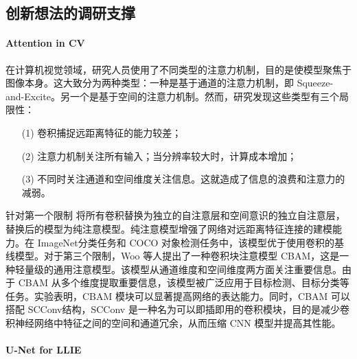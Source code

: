 \documentclass[a4paper, 10pt]{article}
\begin{document}
		\subsection{创新想法的调研支撑}
		
		\paragraph{Attention in CV}
		
		在计算机视觉领域，研究人员使用了不同类型的注意力机制，目的是使模型聚焦于图像本身。这大致分为两种类型：一种是基于通道的注意力机制，即 Squeeze-and-Excite。另一个是基于空间的注意力机制\cite{woo2018cbam}。然而，研究发现这些类型有三个局限性：
		
		\begin{itemize}
			\item[(1)] 
			卷积捕捉远距离特征的能力较差；
			
			\item[(2)]
			注意力机制关注所有输入；当分辨率较大时，计算成本增加；
			
			\item[(3)]
			不同时关注通道和空间维度关注信息。这就造成了信息的浪费和注意力的减弱。
		\end{itemize}	
		
		针对第一个限制 \cite{ramachandran2019stand} 将所有卷积替换为独立的自注意层和空间意识的独立自注意层，替换后的模型为纯注意模型。纯注意模型增强了网络对远距离特征连接的建模能力。在 ImageNet分类任务和 COCO 对象检测任务中，该模型优于使用卷积的基线模型。对于第三个限制，Woo 等人\cite{woo2018cbam}提出了一种卷积块注意模型 CBAM，这是一种轻量级的通用注意模型。该模型从通道维度和空间维度两方面关注重要信息。由于 CBAM 从多个维度提取重要信息，该模型被广泛应用于目标检测、目标分类等任务。实验表明，CBAM 模块可以显著提高网络的表达能力。同时，CBAM 可以搭配 SCConv\cite{li2023scconv}结构，SCConv 是一种名为可以即插即用的卷积模块，目的是减少卷积神经网络中特征之间的空间和通道冗余，从而压缩 CNN 模型并提高其性能。
		
		\paragraph{U-Net for LLIE}
		
\end{document}
